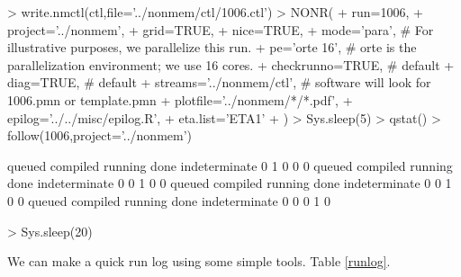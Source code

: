 \begin{Schunk}
\begin{Sinput}
> write.nmctl(ctl,file='../nonmem/ctl/1006.ctl')
> NONR(
+      run=1006,
+      project='../nonmem',
+      grid=TRUE,
+      nice=TRUE,
+      mode='para',                         # For illustrative purposes, we parallelize this run.
+      pe='orte 16',                        # orte is the parallelization environment; we use 16 cores.
+      checkrunno=TRUE,                     # default
+      diag=TRUE,                           # default
+      streams='../nonmem/ctl',             # software will look for 1006.pmn or template.pmn
+      plotfile='../nonmem/*/*.pdf',
+      epilog='../../misc/epilog.R',
+      eta.list='ETA1'
+ )
> Sys.sleep(5)
> qstat()
> follow(1006,project='../nonmem')
\end{Sinput}
\begin{Soutput}
       queued      compiled       running          done indeterminate 
            0             1             0             0             0 
       queued      compiled       running          done indeterminate 
            0             0             1             0             0 
       queued      compiled       running          done indeterminate 
            0             0             1             0             0 
       queued      compiled       running          done indeterminate 
            0             0             0             1             0 
\end{Soutput}
\begin{Sinput}
> Sys.sleep(20)
\end{Sinput}
\end{Schunk}
We can make a quick run log using some simple tools. Table \ref{runlog}.
